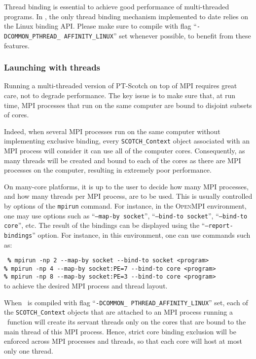 Thread binding is essential to achieve good performance of
multi-threaded programs. In \scotch, the only thread binding mechanism
implemented to date relies on the Linux binding API. Please make sure
to compile with flag ``\texttt{-DCOMMON\_\lbt PTHREAD\_\lbt
AFFINITY\_\lbt LINUX}'' set whenever possible, to benefit from these
features.

\subsubsection{Launching with threads}

Running a multi-threaded version of PT-Scotch on top of MPI requires
great care, not to degrade performance. The key issue is to make sure
that, at run time, MPI processes that run on the same computer are
bound to disjoint subsets of cores.

Indeed, when several MPI processes run on the same computer without
implementing exclusive binding, every \texttt{SCOTCH\_\lbt Context}
object associated with an MPI process will consider it can use all
of the computer cores. Consequently, as many threads will be created
and bound to each of the cores as there are MPI processes on the
computer, resulting in extremely poor performance.

On many-core platforms, it is up to the user to decide how many MPI
processes, and how many threads per MPI process, are to be used. This
is usually controlled by options of the \texttt{mpirun} command. For
instance, in the \textsc{OpenMPI} environment, one may use options
such as ``\texttt{--map-by socket}'', ``\texttt{--bind-to socket}'',
``\texttt{--bind-to core}'', etc. The result of the bindings can be
displayed using the ``\texttt{--report-bindings}'' option. For
instance, in this environment, one can use commands such as:

\noi
{\tt
{\bf\%} \verb+mpirun -np 2 --map-by socket --bind-to socket <program>+\\
{\bf\%} \verb+mpirun -np 4 --map-by socket:PE=7 --bind-to core <program>+\\
{\bf\%} \verb+mpirun -np 8 --map-by socket:PE=3 --bind-to core <program>+\\
}
\noi
to achieve the desired MPI process and thread layout.

When \scotch\ is compiled with flag ``\texttt{-DCOMMON\_\lbt
PTHREAD\_\lbt AFFINITY\_\lbt LINUX}'' set, each of the
\texttt{SCOTCH\_\lbt Context} objects that are attached to an MPI
process running a \libptscotch\ function will create its servant
threads only on the cores that are bound to the main thread of this
MPI process. Hence, strict core binding exclusion will be enforced
across MPI processes and threads, so that each core will host at most
only one thread.


